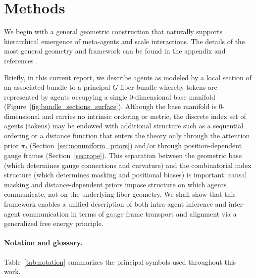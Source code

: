 \documentclass[twoside,11pt]{article}
\begin{document}
\section{Methods}

We begin with a general geometric construction that naturally supports hierarchical emergence of meta-agents and scale interactions. The details of the most general geometry and framework can be found in the appendix and references \citep{nakahara2003geometry,kullback1951information,sternberg1994group,fulton1991representation,frankel2011geometry,baez1994gauge}.

Briefly, in this current report, we describe agents as modeled by a local section of an associated bundle to a principal $G$ fiber bundle whereby tokens are represented by agents occupying a single 0-dimensional base manifold (Figure~\ref{fig:bundle_sections_surface}). Although the base manifold is 0-dimensional and carries no intrinsic ordering or metric, the discrete index set of agents (tokens) may be endowed with additional structure such as a sequential ordering or a distance function that enters the theory only through the attention prior $\pi_j$ (Section~\ref{sec:nonuniform_priors}) and/or through position-dependent gauge frames (Section~\ref{sec:rope}). This separation between the geometric base (which determines gauge connections and curvature) and the combinatorial index structure (which determines masking and positional biases) is important: causal masking and distance-dependent priors impose structure on which agents communicate, not on the underlying fiber geometry. We shall show that this framework enables a unified description of both intra-agent inference and inter-agent communication in terms of gauge frame transport and alignment via a generalized free energy principle.

\paragraph{Notation and glossary.} Table~\ref{tab:notation} summarizes the principal symbols used throughout this work.
\end{document}
